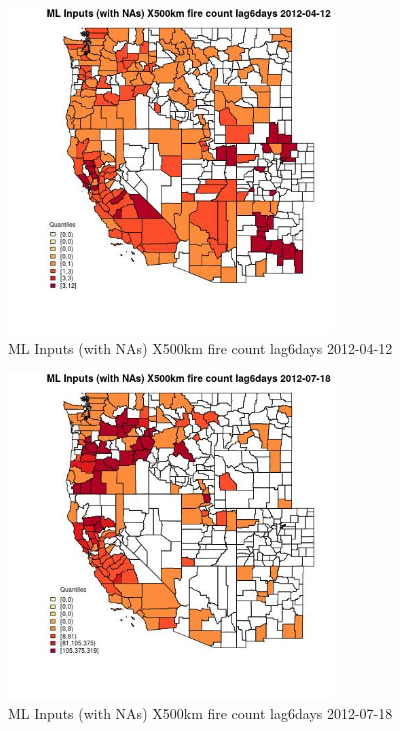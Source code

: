 \begin{figure} 
\centering  
\includegraphics[width=0.77\textwidth]{Code_Outputs/Report_ML_input_PM25_Step4_part_e_de_duplicated_aves_compiled_2019-05-14wNAs_CountyX500km_fire_count_lag6daysMean2012-04-12_2012-04-12.jpg} 
\caption{\label{fig:Report_ML_input_PM25_Step4_part_e_de_duplicated_aves_compiled_2019-05-14wNAsCountyX500km_fire_count_lag6daysMean2012-04-12_2012-04-12}ML Inputs (with NAs) X500km fire count lag6days 2012-04-12} 
\end{figure} 
 

\begin{figure} 
\centering  
\includegraphics[width=0.77\textwidth]{Code_Outputs/Report_ML_input_PM25_Step4_part_e_de_duplicated_aves_compiled_2019-05-14wNAs_CountyX500km_fire_count_lag6daysMean2012-07-18_2012-07-18.jpg} 
\caption{\label{fig:Report_ML_input_PM25_Step4_part_e_de_duplicated_aves_compiled_2019-05-14wNAsCountyX500km_fire_count_lag6daysMean2012-07-18_2012-07-18}ML Inputs (with NAs) X500km fire count lag6days 2012-07-18} 
\end{figure} 
 

